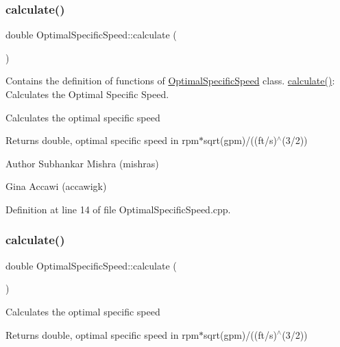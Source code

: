 \subsubsection{\texorpdfstring{calculate()}{calculate()}\hspace{0.1cm}{\footnotesize\ttfamily [1/3]}}
{\footnotesize\ttfamily double Optimal\+Specific\+Speed\+::calculate (\begin{DoxyParamCaption}{ }\end{DoxyParamCaption})}



Contains the definition of functions of \hyperlink{class_optimal_specific_speed}{Optimal\+Specific\+Speed} class. \hyperlink{class_optimal_specific_speed_a75c0c0d37edbff80744f2f6e7fe1f4e1}{calculate()}\+: Calculates the Optimal Specific Speed. 

Calculates the optimal specific speed \begin{DoxyReturn}{Returns}
double, optimal specific speed in rpm$\ast$sqrt(gpm)/((ft/s)$^\wedge$(3/2))
\end{DoxyReturn}
\begin{DoxyAuthor}{Author}
Subhankar Mishra (mishras) 

Gina Accawi (accawigk) 
\end{DoxyAuthor}


Definition at line 14 of file Optimal\+Specific\+Speed.\+cpp.

\mbox{\label{class_optimal_specific_speed_a75c0c0d37edbff80744f2f6e7fe1f4e1}} 
\subsubsection{\texorpdfstring{calculate()}{calculate()}\hspace{0.1cm}{\footnotesize\ttfamily [2/3]}}
{\footnotesize\ttfamily double Optimal\+Specific\+Speed\+::calculate (\begin{DoxyParamCaption}{ }\end{DoxyParamCaption})}

Calculates the optimal specific speed \begin{DoxyReturn}{Returns}
double, optimal specific speed in rpm$\ast$sqrt(gpm)/((ft/s)$^\wedge$(3/2)) 
\end{DoxyReturn}
\mbox{\label{class_optimal_specific_speed_a75c0c0d37edbff80744f2f6e7fe1f4e1}} 
